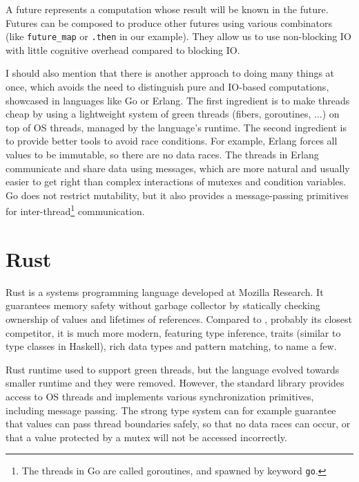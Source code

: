 
A future represents a computation whose result will be known in the future.
Futures can be composed to produce other futures using various combinators (like
\texttt{future_map} or \texttt{.then} in our example). They allow us to use
non-blocking IO with little cognitive overhead compared to blocking IO.

I should also mention that there is another approach to doing many things at
once, which avoids the need to distinguish pure and IO-based computations,
showcased in languages like Go or Erlang. The first ingredient is to make
threads cheap by using a lightweight system of green threads (fibers,
goroutines, ...) on top of OS threads, managed by the language's runtime. The
second ingredient is to provide better tools to avoid race conditions. For
example, Erlang forces all values to be immutable, so there are no data races.
The threads in Erlang communicate and share data using messages, which are more
natural and usually easier to get right than complex interactions of mutexes and
condition variables. Go does not restrict mutability, but it also provides a
message-passing primitives for inter-thread\footnote{The threads in Go are
called goroutines, and spawned by keyword \texttt{go}.} communication.

\section{Rust}

Rust \cite{rust-lang} is a systems programming language developed at Mozilla
Research. It guarantees memory safety without garbage collector by statically
checking ownership of values and lifetimes of references. Compared to
\Cplusplus, probably its closest competitor, it is much more modern, featuring
type inference, traits (similar to type classes in Haskell), rich data types and
pattern matching, to name a few.

Rust runtime used to support green threads, but the language evolved towards
smaller runtime and they were removed.  However, the standard library provides
access to OS threads and implements various synchronization primitives,
including message passing. The strong type system can for example guarantee that
values can pass thread boundaries safely, so that no data races can occur, or
that a value protected by a mutex will not be accessed incorrectly.

